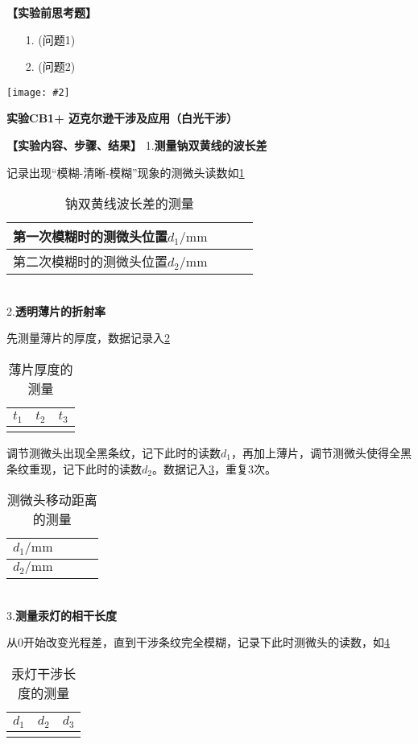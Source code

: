 \documentclass[11pt,a4paper]{ctexart}
\newcommand{\ExpeName}{实验CB1+ 迈克尔逊干涉及应用（白光干涉）}
\newcommand{\cpic}[2]{
\begin{center}
\texttt{[image: \#2]}
\end{center}
}
\newcommand{\emptyline}{\par \ \\}
\begin{document}
\textbf{【实验前思考题】}
\begin{enumerate}
 \item[1.] (问题1)
 \item[2.] (问题2)
\end{enumerate}

\newpage%
\cpic{0.255}{e2}%
\begin{center}
\LARGE{\textbf{\ExpeName}}
\end{center}
\textbf{【实验内容、步骤、结果】}
1.\textbf{测量钠双黄线的波长差}\par
记录出现“模糊-清晰-模糊”现象的测微头读数如\cref{table2}
\begin{table}[H]
    \centering
    \caption{钠双黄线波长差的测量}
    \label{table2}
    \begin{tabular}{|c|p{20mm}|p{20mm}|p{20mm}|}
    \hline
    第一次模糊时的测微头位置$d_1/\mathrm{mm}$ &   &    & \\ \hline
    第二次模糊时的测微头位置$d_2/\mathrm{mm}$ &   &    & \\ \hline
    \end{tabular}
\end{table}
\emptyline
2.\textbf{透明薄片的折射率}
\par
先测量薄片的厚度，数据记录入\cref{table3}
\begin{table}[H]
    \centering
    \caption{薄片厚度的测量}
    \label{table3}
    \begin{tabular}{|p{20mm}|p{20mm}|p{20mm}|}
    \hline
    $t_1$ & $t_2$ & $t_3$ \\ \hline
     &  &  \\ \hline
    \end{tabular}
\end{table}
\par
调节测微头出现全黑条纹，记下此时的读数$d_1$，再加上薄片，调节测微头使得全黑条纹重现，记下此时的读数$d_2$。数据记入\cref{table1}，重复3次。
\begin{table}[H]
    \centering
    \caption{测微头移动距离的测量}
    \label{table1}
    \begin{tabular}{|c|p{20mm}|p{20mm}|p{20mm}|}
    \hline
    $d_1/\mathrm{mm}$ &   &    & \\ \hline
    $d_2/\mathrm{mm}$ &   &    & \\ \hline
    \end{tabular}
\end{table}
\emptyline
3.\textbf{测量汞灯的相干长度}\par
从0开始改变光程差，直到干涉条纹完全模糊，记录下此时测微头的读数，如\cref{table4}
\begin{table}[H]
    \centering
    \caption{汞灯干涉长度的测量}
    \label{table4}
    \begin{tabular}{|p{20mm}|p{20mm}|p{20mm}|}
    \hline
    $d_1$ & $d_2$ & $d_3$ \\ \hline
     &  &  \\ \hline
    \end{tabular}
\end{table}
\end{document}
